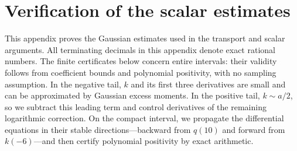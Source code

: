 \section{Verification of the scalar estimates}\label{cert:verification}

This appendix proves the Gaussian estimates used in the transport and scalar
arguments. All terminating decimals in this appendix denote exact rational
numbers. The finite certificates below concern entire intervals: their
validity follows from coefficient bounds and polynomial positivity, with no
sampling assumption.
In the negative tail, $k$ and its first three derivatives are small and
can be approximated by Gaussian excess moments. In the positive tail,
$k\sim a/2$, so we subtract this leading term and control derivatives of
the remaining logarithmic correction. On the compact interval, we
propagate the differential equations in their stable directions---backward
from $q(10)$ and forward from $k(-6)$---and then certify polynomial
positivity by exact arithmetic.


